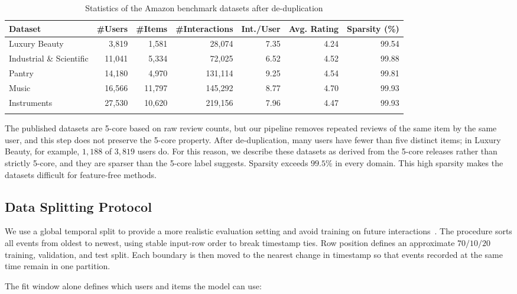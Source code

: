 \documentclass[pdflatex,sn-vancouver-num]{sn-jnl}%
\theoremstyle{thmstyleone}%
\theoremstyle{thmstyletwo}%
\theoremstyle{thmstylethree}%
\begin{document}
\begin{table}[ht]
\caption{Statistics of the Amazon benchmark datasets after de-duplication}
\label{tab:dataset_stats}
\centering
\setlength{\tabcolsep}{4pt}
\begin{tabular}{@{}lrrrrrr@{}}
\toprule
Dataset & \#Users & \#Items & \#Interactions & Int./User & Avg. Rating & Sparsity (\%) \\
\midrule
Luxury Beauty            & 3,819  & 1,581  & 28,074  & 7.35 & 4.24 & 99.54 \\
Industrial \& Scientific & 11,041 & 5,334  & 72,025  & 6.52 & 4.52 & 99.88 \\
Pantry                   & 14,180 & 4,970  & 131,114 & 9.25 & 4.54 & 99.81 \\
Music                    & 16,566 & 11,797 & 145,292 & 8.77 & 4.70 & 99.93 \\
Instruments              & 27,530 & 10,620 & 219,156 & 7.96 & 4.47 & 99.93 \\
\botrule
\end{tabular}
\end{table}

The published datasets are 5-core based on raw review counts, but our pipeline removes repeated reviews of the same item by the same user, and this step does not preserve the 5-core property. After de-duplication, many users have fewer than five distinct items; in Luxury Beauty, for example, $1{,}188$ of $3{,}819$ users do. For this reason, we describe these datasets as derived from the 5-core releases rather than strictly 5-core, and they are sparser than the 5-core label suggests. Sparsity exceeds $99.5\%$ in every domain. This high sparsity makes the datasets difficult for feature-free methods.

\subsection{Data Splitting Protocol}\label{sec4_split}

We use a global temporal split to provide a more realistic evaluation setting and avoid training on future interactions~\cite{meng2020splitting}. The procedure sorts all events from oldest to newest, using stable input-row order to break timestamp ties. Row position defines an approximate $70/10/20$ training, validation, and test split. Each boundary is then moved to the nearest change in timestamp so that events recorded at the same time remain in one partition.

The fit window alone defines which users and items the model can use:
\end{document}
